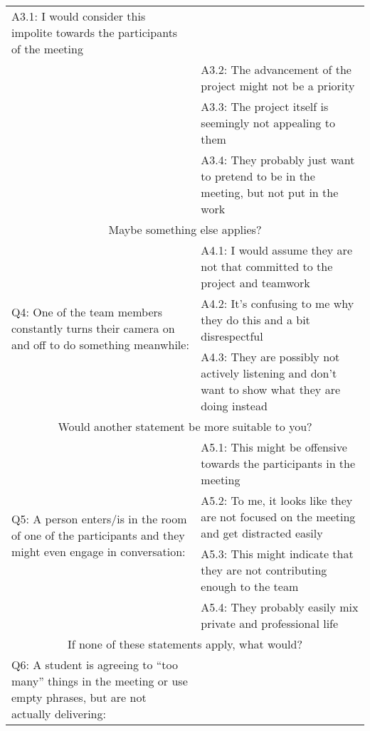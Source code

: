 \begin{longtable}{|  p{}  |  p{} |}
    \hspace{0.3cm} A3.1: I would consider this impolite towards the participants of the meeting \\
   & \hspace{0.3cm} A3.2: The advancement of the project might not be a priority\\
   & \hspace{0.3cm} A3.3: The project itself is seemingly not appealing to them \\
   & \hspace{0.3cm} A3.4: They probably just want to pretend to be in the meeting, but not put in the work\\
\hline
\multicolumn{2}{|c|}{Maybe something else applies?} \\
\hline
\multirow{3}{6cm}{Q4: One of the team members constantly turns their camera on and off to do something meanwhile:} & 
    \hspace{0.3cm} A4.1: I would assume they are not that committed to the project and teamwork \\
    & \hspace{0.3cm} A4.2: It’s confusing to me why they do this and a bit disrespectful\\
    & \hspace{0.3cm} A4.3: They are possibly not actively listening and don’t want to show what they are doing instead\\
\hline
\multicolumn{2}{|c|}{Would another statement be more suitable to you?} \\
\hline
\multirow{4}{6cm}{Q5: A person enters/is in the room of one of the participants and they might even engage in conversation:} & 
    \hspace{0.3cm} A5.1: This might be offensive towards the participants in the meeting \\
    & \hspace{0.3cm} A5.2: To me, it looks like they are not focused on the meeting and get distracted easily \\
    & \hspace{0.3cm} A5.3: This might indicate that they are not contributing enough to the team \\
   & \hspace{0.3cm} A5.4: They probably easily mix private and professional life \\
\hline
\multicolumn{2}{|c|}{If none of these statements apply, what would?} \\
\hline
\multirow{4}{6cm}{Q6: A student is agreeing to “too many” things in the meeting or use empty phrases, but are not actually delivering:} & 

\end{longtable}
